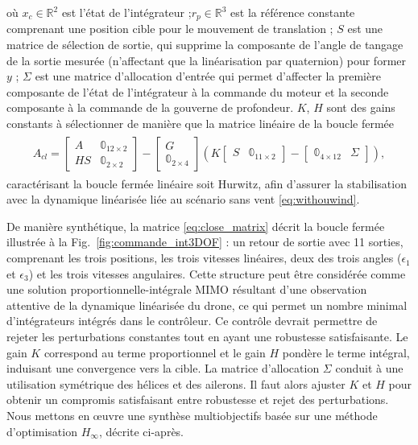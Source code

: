où $x_{c} \in \mathbb{R}^{2}$ est l'état de l'intégrateur ;$r_{p} \in \mathbb{R}^{3}$ est la référence constante comprenant une position cible pour le mouvement de translation ; $S$ est une matrice de sélection de sortie, qui supprime la composante de l'angle de tangage de la sortie mesurée (n'affectant que la linéarisation par quaternion) pour former $y$ ; $\Sigma$ est une matrice d'allocation d'entrée qui permet d'affecter la première composante de l'état de l'intégrateur à la commande du moteur et la seconde composante à la commande de la gouverne de profondeur. $K$, $H$ sont des gains constants à sélectionner de manière que la matrice linéaire de la boucle fermée 
\begin{align} \label{eq:close_matrix}
    \begin{gathered}
        A_{cl} \!= \!
        \begin{bmatrix}A & \mathbb{0}_{12\times 2} \\ HS & \mathbb{0}_{2\times 2}\end{bmatrix} \!- \!\begin{bmatrix}G \\ \mathbb{0}_{2\times 4}\end{bmatrix} \left( K \begin{bmatrix}S & \mathbb{0}_{11\times 2}\end{bmatrix} -  \begin{bmatrix}\mathbb{0}_{4\times 12} & \Sigma \end{bmatrix}\right),
    \end{gathered}
\end{align}
caractérisant la boucle fermée linéaire soit Hurwitz, afin d'assurer la stabilisation avec la dynamique linéarisée liée au scénario sans vent \eqref{eq:withouwind}.

De manière synthétique, la matrice \eqref{eq:close_matrix} décrit la boucle fermée illustrée à la Fig.~\ref{fig:commande_int3DOF} : un retour de sortie avec 11 sorties, comprenant les trois positions, les trois vitesses linéaires, deux des trois angles ($\epsilon_{1}$ et $\epsilon_{3}$) et les trois vitesses angulaires. Cette structure peut être considérée comme une solution proportionnelle-intégrale MIMO  résultant d'une observation attentive de la dynamique linéarisée du drone, ce qui permet un nombre minimal d'intégrateurs intégrés dans le contrôleur. Ce contrôle devrait permettre de rejeter les perturbations constantes tout en ayant une robustesse satisfaisante. Le gain $K$ correspond au terme proportionnel et le gain $H$ pondère le terme intégral, induisant une convergence vers la cible. La matrice d'allocation $\Sigma$ conduit à une utilisation symétrique des hélices et des ailerons. Il faut alors ajuster $K$ et $H$ pour obtenir un compromis satisfaisant entre robustesse et rejet des perturbations. Nous mettons en œuvre une synthèse multiobjectifs basée sur une méthode d'optimisation $H_{\infty}$, décrite ci-après.

